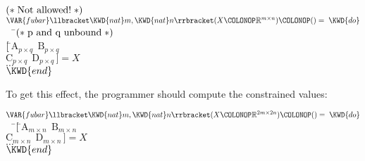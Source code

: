 \begin{Fortress}
\(\mathtt{(*}\;\hbox{\rm  Not allowed! \unskip}\;\mathtt{*)}\)\\
\(\VAR{fubar}\llbracket\KWD{nat} m, \KWD{nat} n\rrbracket(X\COLONOP\mathbb{R}^{m \times n})\COLONOP() = \;\KWD{do}\)\\
{\tt~~}\pushtabs\=\+\(  \mathtt{(*}\;\hbox{\rm  p and q unbound \unskip}\;\mathtt{*)}\)\\
\(  [\,\null\)\pushtabs\=\+\(\mathrm{A}_{p \times q}~~ \mathrm{B}_{p \times q}\)\\
\(    \mathrm{C}_{p \times q}~~ \mathrm{D}_{p \times q}\,] = X\)\-\\\poptabs
\(  \ldots\)\-\\\poptabs
\(\KWD{end}\)
\end{Fortress}
To get this effect, the programmer should compute the constrained values:
\begin{Fortress}
\(\VAR{fubar}\llbracket\KWD{nat} m, \KWD{nat} n\rrbracket(X\COLONOP\mathbb{R}^{2m \times 2n})\COLONOP() = \;\KWD{do}\)\\
{\tt~~}\pushtabs\=\+\(  [\,\null\)\pushtabs\=\+\(\mathrm{A}_{m \times n}~~ \mathrm{B}_{m \times n}\)\\
\(    \mathrm{C}_{m \times n}~~ \mathrm{D}_{m \times n}\,] = X\)\-\\\poptabs
\(  \ldots\)\-\\\poptabs
\(\KWD{end}\)
\end{Fortress}

